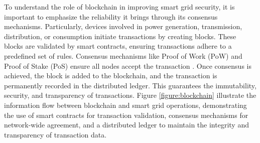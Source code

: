 \documentclass[10pt, journal]{IEEEtran}
\begin{document}
To understand the role of blockchain in improving smart grid security, it is important to emphasize the reliability it brings through its consensus mechanisms. Particularly, devices involved in power generation, transmission, distribution, or consumption initiate transactions by creating blocks. These blocks are validated by smart contracts, ensuring transactions adhere to a predefined set of rules. Consensus mechanisms like Proof of Work (PoW) and Proof of Stake (PoS) ensure all nodes accept the transaction \cite{zhang2019consensus}. Once consensus is achieved, the block is added to the blockchain, and the transaction is permanently recorded in the distributed ledger. This guarantees the immutability, security, and transparency of transactions. Figure \ref{figure:blockchain} illustrate the information flow between blockchain and smart grid operations, demonstrating the use of smart contracts for transaction validation, consensus mechanisms for network-wide agreement, and a distributed ledger to maintain the integrity and transparency of transaction data.


		
\end{document}
